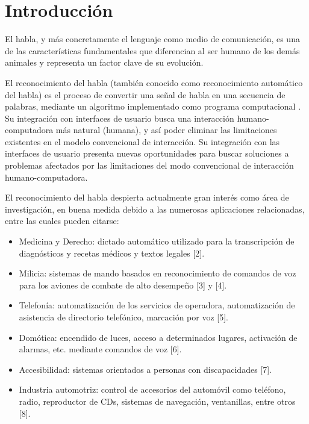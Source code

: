 \section{Introducci\'{o}n}
\label{sec:intro}

El habla, y m\'{a}s concretamente el lenguaje como medio de comunicaci\'{o}n, es una de las 
caracter\'{i}sticas fundamentales 
que diferencian al ser humano de los dem\'{a}s animales y representa un factor clave de su evoluci\'{o}n. 

El reconocimiento del habla (tambi\'{e}n conocido como reconocimiento autom\'{a}tico del habla) 
es el proceso de convertir
una se\~{n}al de habla en una secuencia de palabras, mediante un algoritmo implementado como 
programa computacional \cite{JaisalAReview2012}. Su integraci\'{o}n con interfaces de usuario busca una interacci\'{o}n 
humano-computadora m\'{a}s natural (humana), y as\'{i} poder eliminar las limitaciones existentes
en el modelo convencional de interacci\'{o}n. Su integraci\'{o}n con las 
interfaces de usuario presenta nuevas oportunidades para buscar soluciones a problemas afectados por las 
limitaciones del modo convencional de interacci\'{o}n humano-computadora.

El reconocimiento del habla despierta actualmente gran inter\'{e}s como \'{a}rea de investigaci\'{o}n, 
en buena medida debido a las numerosas aplicaciones relacionadas, entre las cuales pueden citarse:

\begin{itemize}
    \item Medicina y Derecho: dictado autom\'{a}tico utilizado para la transcripci\'{o}n de 
    diagn\'{o}sticos y recetas m\'{e}dicos y textos legales [2].

    \item Milicia: sistemas de mando basados en reconocimiento de comandos de voz para los aviones 
    de combate de alto desempeño [3] y [4].

    \item Telefon\'{i}a: automatizaci\'{o}n de los servicios de operadora, automatizaci\'{o}n de 
    asistencia de directorio telef\'{o}nico, marcaci\'{o}n por voz [5].

    \item Dom\'{o}tica: encendido de luces, acceso a determinados lugares, activaci\'{o}n de alarmas, etc. 
    mediante comandos de voz [6].

    \item Accesibilidad: sistemas orientados a personas con discapacidades [7].

    \item Industria automotriz: control de accesorios del autom\'{o}vil como tel\'{e}fono, radio, 
    reproductor de CDs, sistemas de navegaci\'{o}n, ventanillas, entre otros [8].
\end{itemize}



